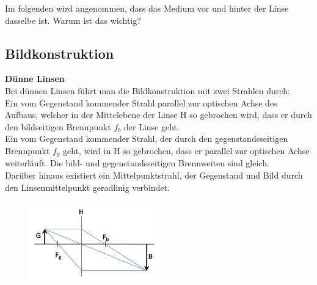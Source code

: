 \noindent
Im folgenden wird angenommen, dass das Medium vor und hinter der Linse dasselbe ist. Warum ist das wichtig?

\subsection{Bildkonstruktion}

\textbf{Dünne Linsen}\\
Bei dünnen Linsen führt man die Bildkonstruktion mit zwei Strahlen durch:\\
Ein vom Gegenstand kommender Strahl parallel zur optischen Achse des Aufbaus, welcher in der Mittelebene der Linse H so gebrochen wird, dass er durch den bildseitigen Brennpunkt $f_b$ der Linse geht.\\
Ein vom Gegenstand kommender Strahl, der durch den gegenstandsseitigen Brennpunkt $f_g$ geht, wird in H so gebrochen, dass er parallel zur optischen Achse weiterläuft. Die bild- und gegenstandsseitigen Brennweiten sind gleich.\\
Darüber hinaus existiert ein Mittelpunktstrahl, der Gegenstand und Bild durch den Linsenmittelpunkt geradlinig verbindet.\\
\begin{figure}[h]
	\centering
		\includegraphics[width=0.5\textwidth]{Versuch_7-8/Abbildungen/duenne_linse.jpg}
	\label{fig:duenne_linse}
\end{figure}


